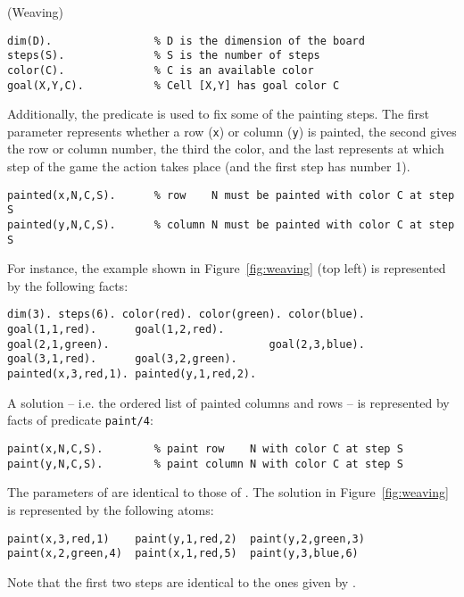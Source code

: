 \documentclass[a4paper,12pt]{article}
\begin{document}
\begin{PraktikumsAufgabe}{2}{(Weaving)}
\vspace{-1.5mm}
\begin{verbatim}
dim(D).                % D is the dimension of the board
steps(S).              % S is the number of steps
color(C).              % C is an available color
goal(X,Y,C).           % Cell [X,Y] has goal color C
\end{verbatim}
\vspace{-1mm}
Additionally, the predicate  is used to fix some of the painting steps.
The first parameter represents whether a row (\verb+x+) or column (\verb+y+) is painted,
the second gives the row or column number,
the third the color, and the last represents at which step of the game the action takes place
(and the first step has number 1).
\begin{verbatim}
painted(x,N,C,S).      % row    N must be painted with color C at step S
painted(y,N,C,S).      % column N must be painted with color C at step S
\end{verbatim}
\newpage
For instance, the example shown in Figure~\ref{fig:weaving} (top left) is
represented by the following facts:%
\vspace{-1.5mm}
\begin{verbatim}
dim(3). steps(6). color(red). color(green). color(blue).
goal(1,1,red).      goal(1,2,red).
goal(2,1,green).                         goal(2,3,blue).
goal(3,1,red).      goal(3,2,green).
painted(x,3,red,1). painted(y,1,red,2).
\end{verbatim}
\vspace{-1mm}
A solution -- i.e. the ordered list of painted columns and rows -- is represented by facts of predicate \texttt{paint/4}:
\vspace{-1.5mm}
\begin{verbatim}
paint(x,N,C,S).        % paint row    N with color C at step S
paint(y,N,C,S).        % paint column N with color C at step S
\end{verbatim}
\vspace{-1mm}
The parameters of  are identical to those of .
The solution in Figure~\ref{fig:weaving} is represented by the following atoms:
\vspace{-1.5mm}
\begin{verbatim}
paint(x,3,red,1)    paint(y,1,red,2)  paint(y,2,green,3)
paint(x,2,green,4)  paint(x,1,red,5)  paint(y,3,blue,6)
\end{verbatim}
\vspace{-1mm}
Note that the first two steps are identical to the ones given by .



\end{PraktikumsAufgabe}
\end{document}
